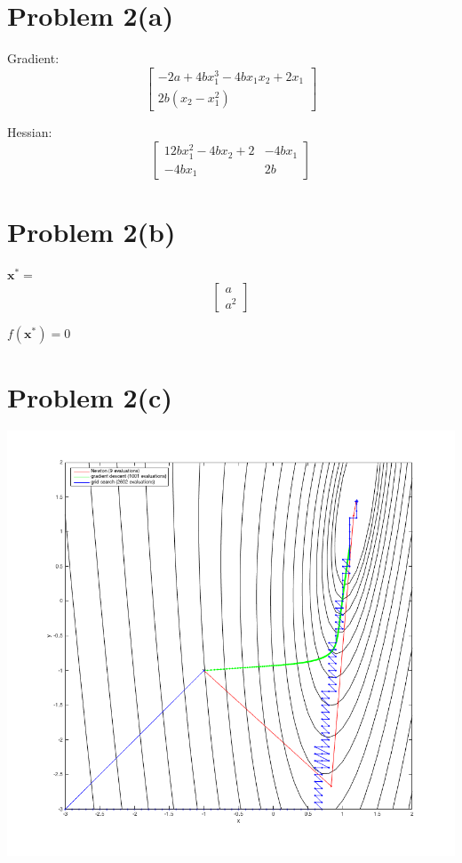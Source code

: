 \documentclass{article}
\begin{document}
\section*{Problem 2(a)}

\begin{center}
Gradient:
\[
	\begin{bmatrix}
		-2a + 4bx_1^3 -4bx_1x_2 + 2x_1\\ 
		2b(x_2-x_1^2)
	\end{bmatrix}
\]

Hessian:
\[
	\begin{bmatrix}
		12bx_1^2-4bx_2+2 & -4bx_1\\
		-4bx_1 & 2b 
	\end{bmatrix}
\]
\end{center}

\section*{Problem 2(b)}


$\mathbf{x^{*}} = $
\[
	\begin{bmatrix}
		a \\
		a^2
	\end{bmatrix}
\]

$f(\mathbf{x^{*}}) = 0$
	

\section*{Problem 2(c)}


\includegraphics[scale=0.5]{code/2c.png}
\end{document}
